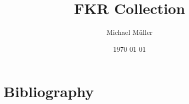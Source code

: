 \documentclass{report}
\title{FKR Collection}
\author{Michael Müller}
\date{\today}
\begin{document}
\newpage

\maketitle

\newpage

\renewcommand{\contentsname}{Table of Content}
\tableofcontents









\section{Bibliography}
\label{bib}

\nocite{*}

\printbibliography[heading=none]
\end{document}
